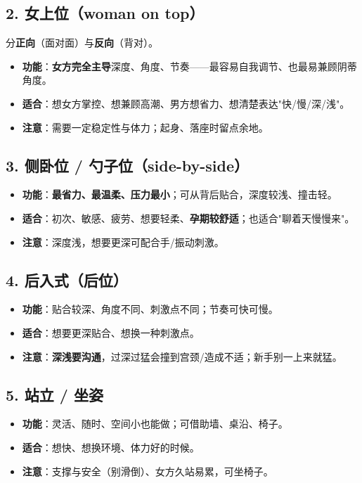 \documentclass[12pt,UTF8,openany]{ctexbook}
\begin{document}
\subsection*{2. 女上位（woman on top）}

分\textbf{正向}（面对面）与\textbf{反向}（背对）。
\begin{itemize}[leftmargin=2em,itemsep=0.3em]
  \item \textbf{功能}：\textbf{女方完全主导}深度、角度、节奏——最容易自我调节、也最易兼顾阴蒂角度。
  \item \textbf{适合}：想女方掌控、想兼顾高潮、男方想省力、想清楚表达"快/慢/深/浅"。
  \item \textbf{注意}：需要一定稳定性与体力；起身、落座时留点余地。
\end{itemize}

\subsection*{3. 侧卧位 / 勺子位（side-by-side）}
\begin{itemize}[leftmargin=2em,itemsep=0.3em]
  \item \textbf{功能}：\textbf{最省力、最温柔、压力最小}；可从背后贴合，深度较浅、撞击轻。
  \item \textbf{适合}：初次、敏感、疲劳、想要轻柔、\textbf{孕期较舒适}；也适合"聊着天慢慢来"。
  \item \textbf{注意}：深度浅，想要更深可配合手/振动刺激。
\end{itemize}

\subsection*{4. 后入式（后位）}
\begin{itemize}[leftmargin=2em,itemsep=0.3em]
  \item \textbf{功能}：贴合较深、角度不同、刺激点不同；节奏可快可慢。
  \item \textbf{适合}：想要更深贴合、想换一种刺激点。
  \item \textbf{注意}：\textbf{深浅要沟通}，过深过猛会撞到宫颈/造成不适；新手别一上来就猛。
\end{itemize}

\subsection*{5. 站立 / 坐姿}
\begin{itemize}[leftmargin=2em,itemsep=0.3em]
  \item \textbf{功能}：灵活、随时、空间小也能做；可借助墙、桌沿、椅子。
  \item \textbf{适合}：想快、想换环境、体力好的时候。
  \item \textbf{注意}：支撑与安全（别滑倒）、女方久站易累，可坐椅子。
\end{itemize}
\end{document}
